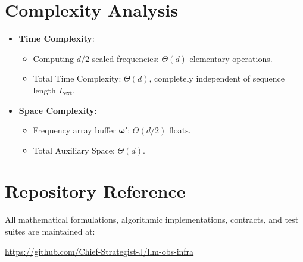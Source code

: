 \documentclass[11pt,a4paper]{article}
\theoremstyle{definition}
\begin{document}
\section{Complexity Analysis}
\begin{itemize}
    \item \textbf{Time Complexity}:
    \begin{itemize}
        \item Computing $d/2$ scaled frequencies: $\Theta(d)$ elementary operations.
        \item Total Time Complexity: $\Theta(d)$, completely independent of sequence length $L_{\text{ext}}$.
    \end{itemize}
    \item \textbf{Space Complexity}:
    \begin{itemize}
        \item Frequency array buffer $\boldsymbol{\omega}'$: $\Theta(d/2)$ floats.
        \item Total Auxiliary Space: $\Theta(d)$.
    \end{itemize}
\end{itemize}

\section{Repository Reference}
All mathematical formulations, algorithmic implementations, contracts, and test suites are maintained at:
\begin{center}
\url{https://github.com/Chief-Strategist-J/llm-obs-infra}
\end{center}
\end{document}
